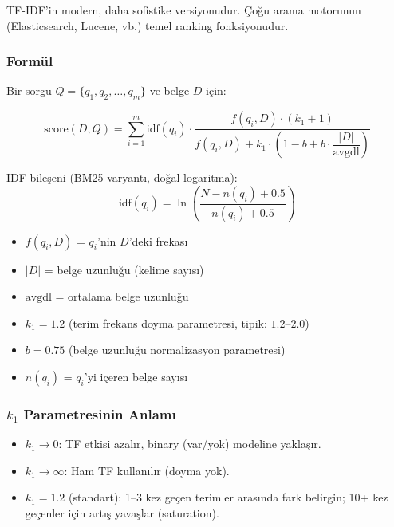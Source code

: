 TF-IDF'in modern, daha sofistike versiyonudur. \c{C}o\u{g}u arama motorunun (Elasticsearch, Lucene, vb.) temel ranking fonksiyonudur.

\subsubsection{Form\"{u}l}

Bir sorgu $Q = \{q_1, q_2, \ldots, q_m\}$ ve belge $D$ i\c{c}in:

\begin{formulbox}
\begin{equation}
\text{score}(D, Q) = \sum_{i=1}^{m} \text{idf}(q_i) \cdot \frac{f(q_i, D) \cdot (k_1 + 1)}{f(q_i, D) + k_1 \cdot \left(1 - b + b \cdot \dfrac{|D|}{\text{avgdl}}\right)}
\label{eq:bm25}
\end{equation}

IDF bile\c{s}eni (BM25 varyant{\i}, do\u{g}al logaritma):
\begin{equation}
\text{idf}(q_i) = \ln\!\left(\frac{N - n(q_i) + 0.5}{n(q_i) + 0.5}\right)
\label{eq:bm25-idf}
\end{equation}

\begin{itemize}
  \item $f(q_i, D)$ = $q_i$'nin $D$'deki frekas{\i}
  \item $|D|$ = belge uzunlu\u{g}u (kelime say{\i}s{\i})
  \item $\text{avgdl}$ = ortalama belge uzunlu\u{g}u
  \item $k_1 = 1.2$ (terim frekans doyma parametresi, tipik: $1.2\text{--}2.0$)
  \item $b = 0.75$ (belge uzunlu\u{g}u normalizasyon parametresi)
  \item $n(q_i)$ = $q_i$'yi i\c{c}eren belge say{\i}s{\i}
\end{itemize}
\end{formulbox}

\subsubsection{$k_1$ Parametresinin Anlam{\i}}

\begin{itemize}
  \item $k_1 \to 0$: TF etkisi azal{\i}r, binary (var/yok) modeline yakla\c{s}{\i}r.
  \item $k_1 \to \infty$: Ham TF kullan{\i}l{\i}r (doyma yok).
  \item $k_1 = 1.2$ (standart): 1--3 kez ge\c{c}en terimler aras{\i}nda fark belirgin; 10+ kez ge\c{c}enler i\c{c}in art{\i}\c{s} yava\c{s}lar (saturation).
\end{itemize}

